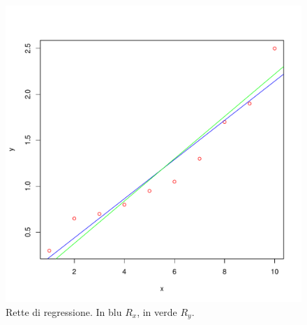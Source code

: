 \documentclass[onecolumn,12pt]{book}\usepackage[]{graphicx}\usepackage[]{color}
\makeatletter
\def\maxwidth{ %
  \ifdim\Gin@nat@width>\linewidth
    \linewidth
  \else
    \Gin@nat@width
  \fi
}
\newenvironment{knitrout}{}{} %
\makeatother
\begin{document}
\begin{center}
\begin{figure}[htbp]
\begin{knitrout}
\color{fgcolor}
\includegraphics[width=\maxwidth]{figure/unnamed-chunk-119-1} 

\end{knitrout}
\caption{Rette di regressione. In blu $R_x$, in verde $R_y$.}
\label{fig:duerettex}
\end{figure}
\end{center}
\end{document}

